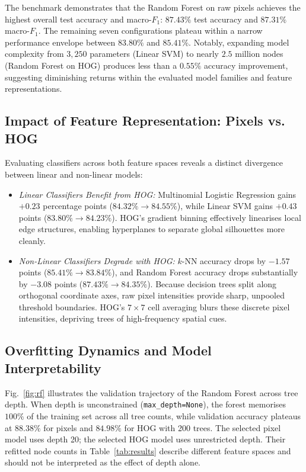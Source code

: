 \documentclass[conference]{IEEEtran}
\newcommand{\code}[1]{\texttt{#1}}
\begin{document}
The benchmark demonstrates that the Random Forest on raw pixels achieves
the highest overall test accuracy and macro-$F_1$:
$87.43\%$ test accuracy and $87.31\%$ macro-$F_1$. The remaining seven
configurations plateau within a narrow performance envelope between
$83.80\%$ and $85.41\%$. Notably, expanding model complexity from
$3{,}250$ parameters (Linear SVM) to nearly $2.5$ million nodes (Random
Forest on HOG) produces less than a $0.55\%$ accuracy improvement,
suggesting diminishing returns within the evaluated model families and
feature representations.

\subsection{Impact of Feature Representation: Pixels vs. HOG}
Evaluating classifiers across both feature spaces reveals a distinct
divergence between linear and non-linear models:
\begin{itemize}
  \item \emph{Linear Classifiers Benefit from HOG:} Multinomial Logistic
    Regression gains $+0.23$ percentage points ($84.32\% \to 84.55\%$),
    while Linear SVM gains $+0.43$ points ($83.80\% \to 84.23\%$). HOG's
    gradient binning effectively linearises local edge structures, enabling
    hyperplanes to separate global silhouettes more cleanly.
  \item \emph{Non-Linear Classifiers Degrade with HOG:} $k$-NN accuracy
    drops by $-1.57$ points ($85.41\% \to 83.84\%$), and Random Forest
    accuracy drops substantially by $-3.08$ points ($87.43\% \to 84.35\%$).
    Because decision trees split along orthogonal coordinate axes, raw
    pixel intensities provide sharp, unpooled threshold boundaries. HOG's
    $7\times 7$ cell averaging blurs these discrete pixel intensities,
    depriving trees of high-frequency spatial cues.
\end{itemize}

\subsection{Overfitting Dynamics and Model Interpretability}
Fig.~\ref{fig:rf} illustrates the validation trajectory of the Random
Forest across tree depth. When depth is unconstrained (\code{max\_depth=None}),
the forest memorises $100\%$ of the training set across all tree counts,
while validation accuracy plateaus at $88.38\%$ for pixels and $84.98\%$
for HOG with 200 trees. The selected pixel model uses depth 20; the
selected HOG model uses unrestricted depth. Their refitted node counts
in Table~\ref{tab:results} describe different feature spaces and should
not be interpreted as the effect of depth alone.
\end{document}
